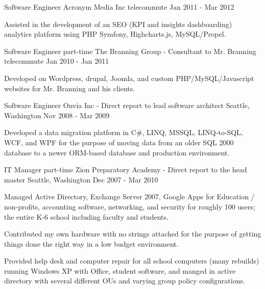 \begin{cventries}
    \cventry
    {Software Engineer}
    {Acronym Media Inc}
    {telecommute}
    {Jan 2011 - Mar 2012}
    {
        \begin{cvitems}
        \item {Assisted in the development of an SEO (KPI and insights dashboarding) analytics platform using PHP Symfony, Highcharts.js, MySQL/Propel.}
        \end{cvitems}
    }

    \cventry
    {Software Engineer part-time}
    {The Branning Group - Consultant to Mr. Branning}
    {telecommute}
    {Jan 2010 - Jan 2011}
    {
        \begin{cvitems}
        \item {Developed on Wordpress, drupal, Joomla, and custom PHP/MySQL/Javascript websites for Mr. Branning and his clients.}
        \end{cvitems}
    }

    \cventry
    {Software Engineer}
    {Onvia Inc - Direct report to lead software architect}
    {Seattle, Washington}
    {Nov 2008 - Mar 2009}
    {
        \begin{cvitems}
        \item {Developed a data migration platform in C\#, LINQ, MSSQL, LINQ-to-SQL, WCF, and WPF for the purpose of moving data from an older SQL 2000 database to a newer ORM-based database and production environment.}
        \end{cvitems}
    }

    \cventry
    {IT Manager part-time} 
    {Zion Preparatory Academy - Direct report to the head master} 
    {Seattle, Washington} 
    {Dec 2007 - Mar 2010} 
    { 
        \begin{cvitems}
        \item {Managed Active Directory, Exchange Server 2007, Google Apps for Education / non-profits, accounting software, networking, and security for roughly 100 users; the entire K-6 school including faculty and students.}
        \item {Contributed my own hardware with no strings attached for the purpose of getting things done the right way in a low budget environment.}
        \item {Provided help desk and computer repair for all school computers (many rebuilds) running Windows XP with Office, student software, and manged in active directory with several different OUs and varying group policy configurations.}
        \end{cvitems}
    }


\end{cventries}
